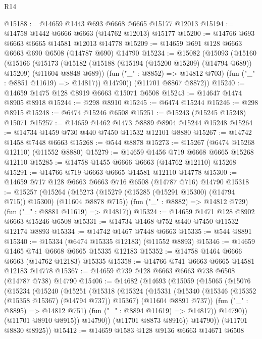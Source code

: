 \begin{lexlean}{R14}
\begin{coremodule}
{{{{{{{{{{{{{{{{{{{{{{{{{{{{{{{{{{{{{{{{{{{{{{{{{{{{{{{{{{{{{{{{{{{{{{{{{{{{{{{{{{@15188 := @14659 @1443 @693 @6668 @6665 @15177 @12013
@15194 := @14758 @1442 @6666 @6663 (@14762 @12013) @15177
@15200 := @14766 @693 @6663 @6665 @14581 @12013 @14778
@15209 := @14659 @691 @128 @6663 @6663 @690 @6508 (@14787 @690) @14790
@15234 := @15082
    (@15093
      (@15160
        (@15166
          (@15173
            (@15182 (@15188 (@15194 (@15200 @15209) (@14794 @689)) @15209) (@11604 @8848 @689))
            (fun ("_" : @8852) => @14812 @703)
            (fun ("_" : @8851 @11619) => @14817))
          @14790))
      (@11701 @8867 @8872))
@15240 := @14659 @1475 @128 @8919 @6663 @15071 @6508
@15243 := @14647 @1474 @8905 @8918
@15244 := @298 @8910
@15245 := @6474 @15244
@15246 := @298 @8915
@15248 := @6474 @15246 @6508
@15251 := @15243 (@15245 @15248) @15071
@15257 := @14659 @1462 @1473 @8889 @8904 @15244 @15248
@15264 := @14734 @1459 @730 @440 @7450 @11532 @12101 @8880
@15267 := @14742 @1458 @7448 @6663
@15268 := @544 @8878
@15273 := @15267 (@6474 @15268 @12110) (@11552 @8880)
@15279 := @14659 @1456 @719 @6668 @6665 @15268 @12110
@15285 := @14758 @1455 @6666 @6663 (@14762 @12110) @15268
@15291 := @14766 @719 @6663 @6665 @14581 @12110 @14778
@15300 := @14659 @717 @128 @6663 @6663 @716 @6508 (@14787 @716) @14790
@15318 := @15257
    (@15264
      (@15273 (@15279 (@15285 (@15291 @15300) (@14794 @715)) @15300) (@11604 @8878 @715))
      (fun ("_" : @8882) => @14812 @729)
      (fun ("_" : @8881 @11619) => @14817))
@15324 := @14659 @1471 @128 @8902 @6663 @15246 @6508
@15331 := @14734 @1468 @752 @440 @7450 @11532 @12174 @8893
@15334 := @14742 @1467 @7448 @6663
@15335 := @544 @8891
@15340 := @15334 (@6474 @15335 @12183) (@11552 @8893)
@15346 := @14659 @1465 @741 @6668 @6665 @15335 @12183
@15352 := @14758 @1464 @6666 @6663 (@14762 @12183) @15335
@15358 := @14766 @741 @6663 @6665 @14581 @12183 @14778
@15367 := @14659 @739 @128 @6663 @6663 @738 @6508 (@14787 @738) @14790
@15406 := @14682
    (@14693
      (@15059
        (@15065
          (@15076
            (@15234
              (@15240
                (@15251
                  (@15318
                    (@15324
                      (@15331
                        (@15340
                          (@15346 (@15352 (@15358 @15367) (@14794 @737)) @15367)
                          (@11604 @8891 @737))
                        (fun ("_" : @8895) => @14812 @751)
                        (fun ("_" : @8894 @11619) => @14817))
                      @14790))
                  (@11701 @8910 @8915))
                @14790))
            (@11701 @8873 @8916))
          @14790))
      (@11701 @8830 @8925))
@15412 := @14659 @1583 @128 @9136 @6663 @14671 @6508
}}}}}}}}}}}}}}}}}}}}}}}}}}}}}}}}}}}}}}}}}}}}}}}}}}}}}}}}}}}}}}}}}}}}}}}}}}}}}}}}}}
\end{coremodule}
\end{lexlean}
